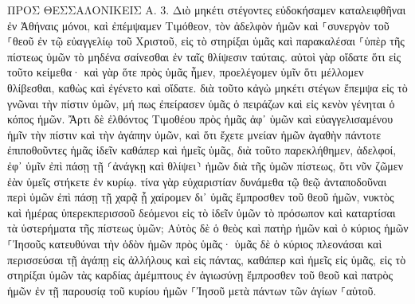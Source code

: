 \documentclass[twoside, 9pt]{extreport}
\begin{document}
ΠΡΟΣ ΘΕΣΣΑΛΟΝΙΚΕΙΣ Α.
3.
Διὸ μηκέτι στέγοντες εὐδοκήσαμεν καταλειφθῆναι ἐν Ἀθήναις μόνοι, 
καὶ ἐπέμψαμεν Τιμόθεον, τὸν ἀδελφὸν ἡμῶν καὶ ⸀συνεργὸν τοῦ ⸀θεοῦ ἐν τῷ εὐαγγελίῳ τοῦ Χριστοῦ, εἰς τὸ στηρίξαι ὑμᾶς καὶ παρακαλέσαι ⸀ὑπὲρ τῆς πίστεως ὑμῶν 
τὸ μηδένα σαίνεσθαι ἐν ταῖς θλίψεσιν ταύταις. αὐτοὶ γὰρ οἴδατε ὅτι εἰς τοῦτο κείμεθα· 
καὶ γὰρ ὅτε πρὸς ὑμᾶς ἦμεν, προελέγομεν ὑμῖν ὅτι μέλλομεν θλίβεσθαι, καθὼς καὶ ἐγένετο καὶ οἴδατε. 
διὰ τοῦτο κἀγὼ μηκέτι στέγων ἔπεμψα εἰς τὸ γνῶναι τὴν πίστιν ὑμῶν, μή πως ἐπείρασεν ὑμᾶς ὁ πειράζων καὶ εἰς κενὸν γένηται ὁ κόπος ἡμῶν. 
Ἄρτι δὲ ἐλθόντος Τιμοθέου πρὸς ἡμᾶς ἀφ᾽ ὑμῶν καὶ εὐαγγελισαμένου ἡμῖν τὴν πίστιν καὶ τὴν ἀγάπην ὑμῶν, καὶ ὅτι ἔχετε μνείαν ἡμῶν ἀγαθὴν πάντοτε ἐπιποθοῦντες ἡμᾶς ἰδεῖν καθάπερ καὶ ἡμεῖς ὑμᾶς, 
διὰ τοῦτο παρεκλήθημεν, ἀδελφοί, ἐφ᾽ ὑμῖν ἐπὶ πάσῃ τῇ ⸂ἀνάγκῃ καὶ θλίψει⸃ ἡμῶν διὰ τῆς ὑμῶν πίστεως, 
ὅτι νῦν ζῶμεν ἐὰν ὑμεῖς στήκετε ἐν κυρίῳ. 
τίνα γὰρ εὐχαριστίαν δυνάμεθα τῷ θεῷ ἀνταποδοῦναι περὶ ὑμῶν ἐπὶ πάσῃ τῇ χαρᾷ ᾗ χαίρομεν δι᾽ ὑμᾶς ἔμπροσθεν τοῦ θεοῦ ἡμῶν, 
νυκτὸς καὶ ἡμέρας ὑπερεκπερισσοῦ δεόμενοι εἰς τὸ ἰδεῖν ὑμῶν τὸ πρόσωπον καὶ καταρτίσαι τὰ ὑστερήματα τῆς πίστεως ὑμῶν; 
Αὐτὸς δὲ ὁ θεὸς καὶ πατὴρ ἡμῶν καὶ ὁ κύριος ἡμῶν ⸀Ἰησοῦς κατευθύναι τὴν ὁδὸν ἡμῶν πρὸς ὑμᾶς· 
ὑμᾶς δὲ ὁ κύριος πλεονάσαι καὶ περισσεύσαι τῇ ἀγάπῃ εἰς ἀλλήλους καὶ εἰς πάντας, καθάπερ καὶ ἡμεῖς εἰς ὑμᾶς, 
εἰς τὸ στηρίξαι ὑμῶν τὰς καρδίας ἀμέμπτους ἐν ἁγιωσύνῃ ἔμπροσθεν τοῦ θεοῦ καὶ πατρὸς ἡμῶν ἐν τῇ παρουσίᾳ τοῦ κυρίου ἡμῶν ⸀Ἰησοῦ μετὰ πάντων τῶν ἁγίων ⸀αὐτοῦ. 
\end{document}
